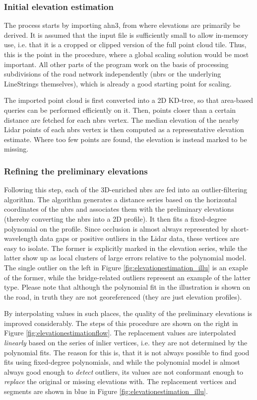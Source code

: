 \subsubsection{Initial elevation estimation}

The process starts by importing \ac{ahn3}, from where elevations are primarily be derived. It is assumed that the input file is sufficiently small to allow in-memory use, i.e. that it is a cropped or clipped version of the full point cloud tile. Thus, this is the point in the procedure, where a global scaling solution would be most important. All other parts of the program work on the basis of processing subdivisions of the road network independently (\ac{nbrs} or the underlying LineStrings themselves), which is already a good starting point for scaling.

The imported point cloud is first converted into a 2D KD-tree, so that area-based queries can be performed efficiently on it. Then, points closer than a certain distance are fetched for each \ac{nbrs} vertex. The median elevation of the nearby Lidar points of each \ac{nbrs} vertex is then computed as a representative elevation estimate. Where too few points are found, the elevation is instead marked to be missing.

\subsubsection{Refining the preliminary elevations}

Following this step, each of the 3D-enriched \ac{nbrs} are fed into an outlier-filtering algorithm. The algorithm generates a distance series based on the horizontal coordinates of the \ac{nbrs} and associates them with the preliminary elevations (thereby converting the \ac{nbrs} into a 2D profile). It then fits a fixed-degree polynomial on the profile. Since occlusion is almost always represented by short-wavelength data gaps or positive outliers in the Lidar data, these vertices are easy to isolate. The former is explicitly marked in the elevation series, while the latter show up as local clusters of large errors relative to the polynomial model. The single outlier on the left in Figure \ref{fig:elevationestimation_illu} is an exaple of the former, while the bridge-related outliers represent an example of the latter type. Please note that although the polynomial fit in the illustration is shown on the road, in truth they are not georeferenced (they are just elevation profiles).

By interpolating values in such places, the quality of the preliminary elevations is improved considerably. The steps of this procedure are shown on the right in Figure \ref{fig:elevationestimationflow}. The replacement values are interpolated \textit{linearly} based on the series of inlier vertices, i.e. they are not determined by the polynomial fits. The reason for this is, that it is not always possible to find good fits using fixed-degree polynomials, and while the polynomial model is almost always good enough to \textit{detect} outliers, its values are not conformant enough to \textit{replace} the original or missing elevations with. The replacement vertices and segments are shown in blue in Figure \ref{fig:elevationestimation_illu}.

